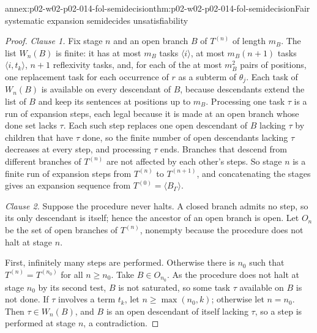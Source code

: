 \begin{annexitem}{annex:p02-w02-p02-014-fol-semidecision}{thm:p02-w02-p02-014-fol-semidecision}{Fair systematic expansion semidecides unsatisfiability}
\begin{proof}
\emph{Clause 1.}  Fix stage \(n\) and an open branch \(B\) of \(T^{(n)}\) of
length \(m_B\).  The list \(W_n(B)\) is finite: it has at most \(m_B\) tasks
\(\langle i\rangle\), at most \(m_B(n+1)\) tasks \(\langle i,t_k\rangle\),
\(n+1\) reflexivity tasks, and, for each of the at most \(m_B^2\) pairs of
positions, one replacement task for each occurrence of \(r\) as a subterm of
\(\theta_j\).  Each task of \(W_n(B)\) is available on every descendant of
\(B\), because descendants extend the list of \(B\) and keep its sentences at
positions up to \(m_B\).  Processing one task \(\tau\) is a run of expansion
steps, each legal because it is made at an open branch whose done set lacks
\(\tau\).  Each such step replaces one open descendant of \(B\) lacking
\(\tau\) by children that have \(\tau\) done, so the finite number of open
descendants lacking \(\tau\) decreases at every step, and processing \(\tau\)
ends.  Branches that descend from different branches of \(T^{(n)}\) are not
affected by each other's steps.  So stage \(n\) is a finite run of expansion
steps from \(T^{(n)}\) to \(T^{(n+1)}\), and concatenating the stages gives an
expansion sequence from \(T^{(0)}=\langle B_\Gamma\rangle\).

\emph{Clause 2.}  Suppose the procedure never halts.  A closed branch admits
no step, so its only descendant is itself; hence the ancestor of an open
branch is open.  Let \(O_n\) be the set of open branches of \(T^{(n)}\),
nonempty because the procedure does not halt at stage \(n\).

First, infinitely many steps are performed.  Otherwise there is \(n_0\) such
that \(T^{(n)}=T^{(n_0)}\) for all \(n\geq n_0\).  Take \(B\in O_{n_0}\).  As
the procedure does not halt at stage \(n_0\) by its second test, \(B\) is not
saturated, so some task \(\tau\) available on \(B\) is not done.  If \(\tau\)
involves a term \(t_k\), let \(n\geq\max(n_0,k)\); otherwise let \(n=n_0\).
Then \(\tau\in W_n(B)\), and \(B\) is an open descendant of itself lacking
\(\tau\), so a step is performed at stage \(n\), a contradiction.


\end{proof}
\end{annexitem}

